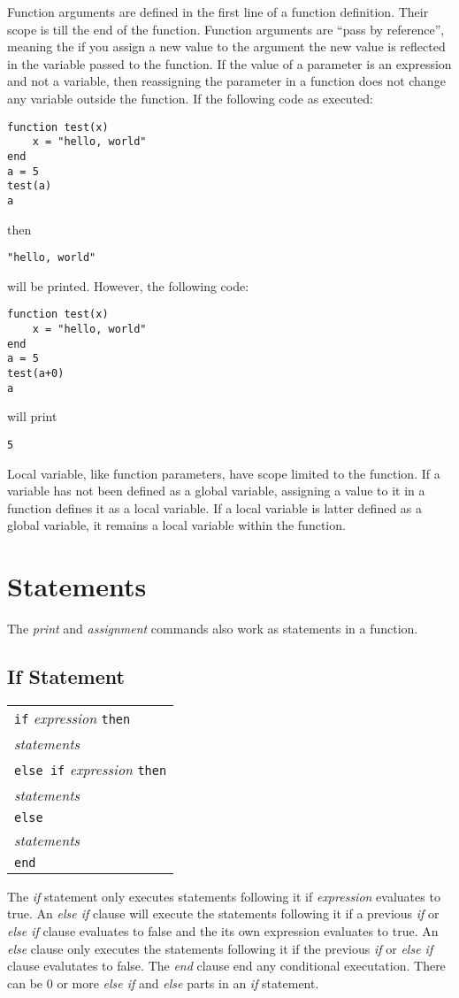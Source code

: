 \documentclass{article}
\begin{document}
Function arguments are defined in the first line of a function definition.
Their scope is till the end of the function.
Function arguments are ``pass by reference'', meaning the if you assign a new value to the argument the new value is reflected in the variable passed to the function.
If the value of a parameter is an expression and not a variable, then reassigning the parameter in a function does not change any variable outside the function.
If the following code as executed:
\begin{verbatim}
function test(x)
    x = "hello, world"
end
a = 5
test(a)
a
\end{verbatim}
then
\begin{verbatim}
"hello, world"
\end{verbatim}
will be printed. However, the following code:
\begin{verbatim}
function test(x)
    x = "hello, world"
end
a = 5
test(a+0)
a
\end{verbatim}
will print
\begin{verbatim}
5
\end{verbatim}

Local variable, like function parameters, have scope limited to the function.
If a variable has not been defined as a global variable, assigning a value
to it in a function defines it as a local variable.
If a local variable is latter defined as a global variable, it remains a local variable within the function.

\section{Statements}
The \emph{print} and \emph{assignment} commands also work as statements in a function.
\subsection{If Statement}
\begin{center}
  \begin{tabular}{l}
    \verb|if| \emph{expression} \verb|then| \\
    \quad\quad \emph{statements} \\
    \verb|else if| \emph{expression} \verb|then| \\
    \quad\quad \emph{statements} \\
    \verb|else| \\
    \quad\quad \emph{statements} \\
    \verb|end| \\
  \end{tabular}
\end{center}
The \emph{if} statement only executes statements following it if \emph{expression} evaluates to true.
An \emph{else if} clause will execute the statements following it if a previous \emph{if} or \emph{else if} clause evaluates to false and the its own expression evaluates to true. An \emph{else} clause only executes the statements following it if the previous \emph{if} or \emph{else if} clause evalutates to false.
The \emph{end} clause end any conditional executation. There can be 0 or more \emph{else if} and \emph{else} parts in an \emph{if} statement.
\end{document}
